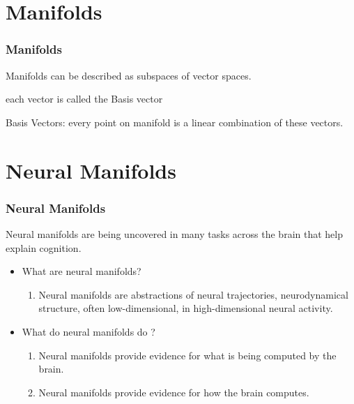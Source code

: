 \documentclass{beamer}
\begin{document}

\section{Manifolds}
\begin{frame}
\frametitle{\textbf{Manifolds} }

Manifolds can be described as subspaces of vector spaces.

each vector is called the Basis vector

Basis Vectors: every point on manifold is a linear combination of these vectors.


\end{frame}


\section{Neural Manifolds}
\begin{frame}
\frametitle{\textbf{Neural Manifolds} }
Neural manifolds are being uncovered in many tasks across the brain that help explain cognition.

\begin{itemize}
    \item What are neural manifolds?
    \begin{enumerate}
        \item Neural manifolds are abstractions of neural trajectories, neurodynamical structure, often low-dimensional, in high-dimensional neural activity.
    \end{enumerate}
    \item What do neural manifolds do ?
    \begin{enumerate}
        \item Neural manifolds provide evidence for what is being computed by the brain.
        \item Neural manifolds provide evidence for how the brain computes.
    \end{enumerate}
\end{itemize}


\end{frame}
\end{document}
